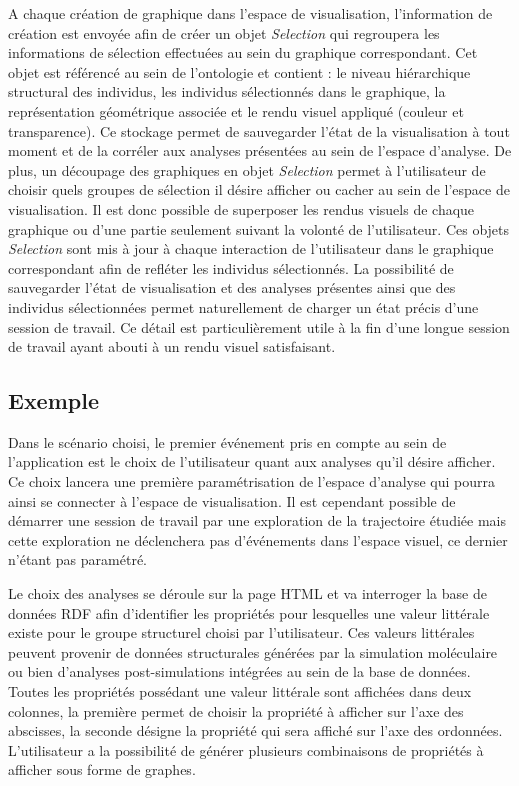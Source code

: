 A chaque création de graphique dans l'espace de visualisation, l'information de création est envoyée afin de créer un objet \textit{Selection} qui regroupera les informations de sélection effectuées au sein du graphique correspondant. Cet objet est référencé au sein de l'ontologie et contient : le niveau hiérarchique structural des individus, les individus sélectionnés dans le graphique, la représentation géométrique associée et le rendu visuel appliqué (couleur et transparence). Ce stockage permet de sauvegarder l'état de la visualisation à tout moment et de la corréler aux analyses présentées au sein de l'espace d'analyse. De plus, un découpage des graphiques en objet \textit{Selection} permet à l'utilisateur de choisir quels groupes de sélection il désire afficher ou cacher au sein de l'espace de visualisation. Il est donc possible de superposer les rendus visuels de chaque graphique ou d'une partie seulement suivant la volonté de l'utilisateur. Ces objets \textit{Selection} sont mis à jour à chaque interaction de l'utilisateur dans le graphique correspondant afin de refléter les individus sélectionnés. La possibilité de sauvegarder l'état de visualisation et des analyses présentes ainsi que des individus sélectionnées permet naturellement de charger un état précis d'une session de travail. Ce détail est particulièrement utile à la fin d'une longue session de travail ayant abouti à un rendu visuel satisfaisant.


\subsection{Exemple}

Dans le scénario choisi, le premier événement pris en compte au sein de l'application est le choix de l'utilisateur quant aux analyses qu'il désire afficher. Ce choix lancera une première paramétrisation de l'espace d'analyse qui pourra ainsi se connecter à l'espace de visualisation. 
Il est cependant possible de démarrer une session de travail par une exploration de la trajectoire étudiée mais cette exploration ne déclenchera pas d'événements dans l'espace visuel, ce dernier n'étant pas paramétré.

Le choix des analyses se déroule sur la page HTML et va interroger la base de données RDF afin d'identifier les propriétés pour lesquelles une valeur littérale existe pour le groupe structurel choisi par l'utilisateur. 
Ces valeurs littérales peuvent provenir de données structurales générées par la simulation moléculaire ou bien d'analyses post-simulations intégrées au sein de la base de données. 
Toutes les propriétés possédant une valeur littérale sont affichées dans deux colonnes, la première permet de choisir la propriété à afficher sur l'axe des abscisses, la seconde désigne la propriété qui sera affiché sur l'axe des ordonnées. 
L'utilisateur a la possibilité de générer plusieurs combinaisons de propriétés à afficher sous forme de graphes. 

